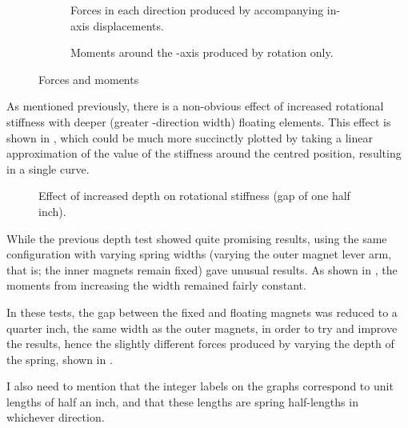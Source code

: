 \begin{figure}
  \begin{subfigure}
    \caption{Forces in each direction produced by accompanying in-axis displacements.}
  \end{subfigure}
  \begin{subfigure}
    \caption{Moments around the \x-axis produced by rotation only.}
  \end{subfigure} 
  \caption{Forces and moments }
\end{figure}

As mentioned previously, there is a non-obvious effect of increased
rotational stiffness with deeper (greater \z-direction width)
floating elements. This effect is shown in
, which could be much
more succinctly plotted by taking a linear approximation of the
value of the stiffness around the centred position, resulting in a
single curve.

\begin{figure}
  \caption{Effect of increased depth on rotational stiffness (gap of one half inch).}
\end{figure}

While the previous depth test showed quite promising results, using
the same configuration with varying spring widths (varying the outer
magnet lever arm, that is; the inner magnets remain fixed) gave
unusual results.  As shown in , the
moments from increasing the width remained fairly constant.

In these tests, the gap between the fixed and floating magnets was
reduced to a quarter inch, the same width as the outer magnets, in
order to try and improve the results, hence the slightly different
forces produced by varying the depth of the spring, shown in
.

I also need to mention that the integer labels on the graphs
correspond to unit lengths of half an inch, and that these lengths
are spring half-lengths in whichever direction.

